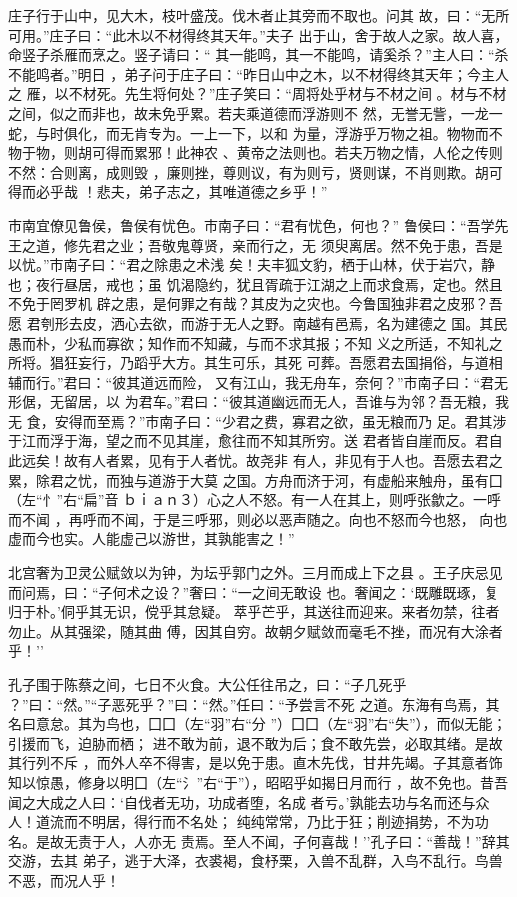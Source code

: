 \documentclass[]{article}
\begin{document}
庄子行于山中，见大木，枝叶盛茂。伐木者止其旁而不取也。问其
故，曰：``无所可用。''庄子曰：``此木以不材得终其天年。''夫子
出于山，舍于故人之家。故人喜，命竖子杀雁而烹之。竖子请曰：``
其一能鸣，其一不能鸣，请奚杀？''主人曰：``杀不能鸣者。''明日
，弟子问于庄子曰：``昨日山中之木，以不材得终其天年；今主人之
雁，以不材死。先生将何处？''庄子笑曰：``周将处乎材与不材之间
。材与不材之间，似之而非也，故未免乎累。若夫乘道德而浮游则不
然，无誉无訾，一龙一蛇，与时俱化，而无肯专为。一上一下，以和
为量，浮游乎万物之祖。物物而不物于物，则胡可得而累邪！此神农
、黄帝之法则也。若夫万物之情，人伦之传则不然：合则离，成则毁
，廉则挫，尊则议，有为则亏，贤则谋，不肖则欺。胡可得而必乎哉
！悲夫，弟子志之，其唯道德之乡乎！''

市南宜僚见鲁侯，鲁侯有忧色。市南子曰：``君有忧色，何也？''
鲁侯曰：``吾学先王之道，修先君之业；吾敬鬼尊贤，亲而行之，无
须臾离居。然不免于患，吾是以忧。''市南子曰：``君之除患之术浅
矣！夫丰狐文豹，栖于山林，伏于岩穴，静也；夜行昼居，戒也；虽
饥渴隐约，犹且胥疏于江湖之上而求食焉，定也。然且不免于罔罗机
辟之患，是何罪之有哉？其皮为之灾也。今鲁国独非君之皮邪？吾愿
君刳形去皮，洒心去欲，而游于无人之野。南越有邑焉，名为建德之
国。其民愚而朴，少私而寡欲；知作而不知藏，与而不求其报；不知
义之所适，不知礼之所将。猖狂妄行，乃蹈乎大方。其生可乐，其死
可葬。吾愿君去国捐俗，与道相辅而行。''君曰：``彼其道远而险，
又有江山，我无舟车，奈何？''市南子曰：``君无形倨，无留居，以
为君车。''君曰：``彼其道幽远而无人，吾谁与为邻？吾无粮，我无
食，安得而至焉？''市南子曰：``少君之费，寡君之欲，虽无粮而乃
足。君其涉于江而浮于海，望之而不见其崖，愈往而不知其所穷。送
君者皆自崖而反。君自此远矣！故有人者累，见有于人者忧。故尧非
有人，非见有于人也。吾愿去君之累，除君之忧，而独与道游于大莫
之国。方舟而济于河，有虚船来触舟，虽有囗（左``忄''右``扁''音
ｂｉａｎ３）心之人不怒。有一人在其上，则呼张歙之。一呼而不闻
，再呼而不闻，于是三呼邪，则必以恶声随之。向也不怒而今也怒，
向也虚而今也实。人能虚己以游世，其孰能害之！''

北宫奢为卫灵公赋敛以为钟，为坛乎郭门之外。三月而成上下之县
。王子庆忌见而问焉，曰：``子何术之设？''奢曰：``一之间无敢设
也。奢闻之：`既雕既琢，复归于朴。'侗乎其无识，傥乎其怠疑。
萃乎芒乎，其送往而迎来。来者勿禁，往者勿止。从其强梁，随其曲
傅，因其自穷。故朝夕赋敛而毫毛不挫，而况有大涂者乎！''

孔子围于陈蔡之间，七日不火食。大公任往吊之，曰：``子几死乎
？''曰：``然。''``子恶死乎？''曰：``然。''任曰：``予尝言不死
之道。东海有鸟焉，其名曰意怠。其为鸟也，囗囗（左``羽''右``分
''）囗囗（左``羽''右``失''），而似无能；引援而飞，迫胁而栖；
进不敢为前，退不敢为后；食不敢先尝，必取其绪。是故其行列不斥
，而外人卒不得害，是以免于患。直木先伐，甘井先竭。子其意者饰
知以惊愚，修身以明囗（左``氵''右``于''），昭昭乎如揭日月而行
，故不免也。昔吾闻之大成之人曰：`自伐者无功，功成者堕，名成
者亏。'孰能去功与名而还与众人！道流而不明居，得行而不名处；
纯纯常常，乃比于狂；削迹捐势，不为功名。是故无责于人，人亦无
责焉。至人不闻，子何喜哉！''孔子曰：``善哉！''辞其交游，去其
弟子，逃于大泽，衣裘褐，食杼栗，入兽不乱群，入鸟不乱行。鸟兽
不恶，而况人乎！
\end{document}
